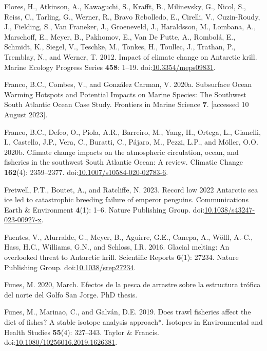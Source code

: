 \documentclass[
]{article}
\newlength{\cslhangindent}
\newenvironment{CSLReferences}[2] %
 {\begin{list}{}{%
  \setlength{\itemindent}{0pt}
  \setlength{\leftmargin}{0pt}
  \setlength{\parsep}{0pt}
  \ifodd #1
   \setlength{\leftmargin}{\cslhangindent}
   \setlength{\itemindent}{-1\cslhangindent}
  \fi
  \setlength{\itemsep}{#2\baselineskip}}}
 {\end{list}}
\begin{document}
\begin{CSLReferences}{1}{0}
Flores, H., Atkinson, A., Kawaguchi, S., Krafft, B., Milinevsky, G.,
Nicol, S., Reiss, C., Tarling, G., Werner, R., Bravo Rebolledo, E.,
Cirelli, V., Cuzin-Roudy, J., Fielding, S., Van Franeker, J.,
Groeneveld, J., Haraldsson, M., Lombana, A., Marschoff, E., Meyer, B.,
Pakhomov, E., Van De Putte, A., Rombolá, E., Schmidt, K., Siegel, V.,
Teschke, M., Tonkes, H., Toullec, J., Trathan, P., Tremblay, N., and
Werner, T. 2012. Impact of climate change on {Antarctic} krill. Marine
Ecology Progress Series \textbf{458}: 1--19.
doi:\href{https://doi.org/10.3354/meps09831}{10.3354/meps09831}.

Franco, B.C., Combes, V., and González Carman, V. 2020a. Subsurface
{Ocean Warming Hotspots} and {Potential Impacts} on {Marine Species}:
{The Southwest South Atlantic Ocean Case Study}. Frontiers in Marine
Science \textbf{7}. {[}accessed 10 August 2023{]}.

Franco, B.C., Defeo, O., Piola, A.R., Barreiro, M., Yang, H., Ortega,
L., Gianelli, I., Castello, J.P., Vera, C., Buratti, C., Pájaro, M.,
Pezzi, L.P., and Möller, O.O. 2020b. Climate change impacts on the
atmospheric circulation, ocean, and fisheries in the southwest {South
Atlantic Ocean}: A review. Climatic Change \textbf{162}(4): 2359--2377.
doi:\href{https://doi.org/10.1007/s10584-020-02783-6}{10.1007/s10584-020-02783-6}.

Fretwell, P.T., Boutet, A., and Ratcliffe, N. 2023. Record low 2022
{Antarctic} sea ice led to catastrophic breeding failure of emperor
penguins. Communications Earth \& Environment \textbf{4}(1): 1--6.
Nature Publishing Group.
doi:\href{https://doi.org/10.1038/s43247-023-00927-x}{10.1038/s43247-023-00927-x}.

Fuentes, V., Alurralde, G., Meyer, B., Aguirre, G.E., Canepa, A., Wölfl,
A.-C., Hass, H.C., Williams, G.N., and Schloss, I.R. 2016. Glacial
melting: An overlooked threat to {Antarctic} krill. Scientific Reports
\textbf{6}(1): 27234. Nature Publishing Group.
doi:\href{https://doi.org/10.1038/srep27234}{10.1038/srep27234}.

Funes, M. 2020, March. Efectos de la pesca de arrastre sobre la
estructura tr{ó}fica del norte del {Golfo San Jorge}. PhD thesis.

Funes, M., Marinao, C., and Galván, D.E. 2019. Does trawl fisheries
affect the diet of fishes? {A} stable isotope analysis approach*.
Isotopes in Environmental and Health Studies \textbf{55}(4): 327--343.
Taylor \& Francis.
doi:\href{https://doi.org/10.1080/10256016.2019.1626381}{10.1080/10256016.2019.1626381}.


\end{CSLReferences}
\end{document}
